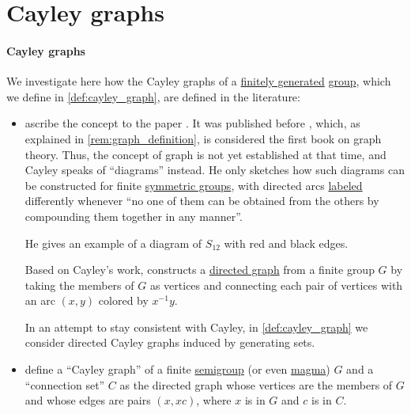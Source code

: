 \section{Cayley graphs}\label{sec:cayley_graphs}

\paragraph{Cayley graphs}

\begin{remark}\label{rem:cayley_graph_overview}
  We investigate here how the Cayley graphs of a \hyperref[def:group_presentation]{finitely generated} \hyperref[def:group]{group}, which we define in \cref{def:cayley_graph}, are defined in the literature:
  \begin{itemize}
    \item {} ascribe the concept to the paper . It was published before \cite{König1986Graphentheorie}, which, as explained in \cref{rem:graph_definition}, is considered the first book on graph theory. Thus, the concept of graph is not yet established at that time, and Cayley speaks of \enquote{diagrams} instead. He only sketches how such diagrams can be constructed for finite \hyperref[def:symmetric_group]{symmetric groups}, with directed arcs \hyperref[def:labeled_set]{labeled} differently whenever \enquote{no one of them can be obtained from the others by compounding them together in any manner}.

    He gives an example of a diagram of \( S_{12} \) with red and black edges.

    Based on Cayley's work,  constructs a \hyperref[def:directed_graph]{directed graph} from a finite group \( G \) by taking the members of \( G \) as vertices and connecting each pair of vertices with an arc \( (x, y) \) colored by \( x^{-1} y \).

    In an attempt to stay consistent with Cayley, in \cref{def:cayley_graph} we consider directed Cayley graphs induced by generating sets.

    \item {} define a \enquote{Cayley graph} of a finite \hyperref[def:semigroup]{semigroup} (or even \hyperref[rem:magma_terminology]{magma}) \( G \) and a \enquote{connection set} \( C \) as the directed graph whose vertices are the members of \( G \) and whose edges are pairs \( (x, xc) \), where \( x \) is in \( G \) and \( c \) is in \( C \).


\end{itemize}
\end{remark}
